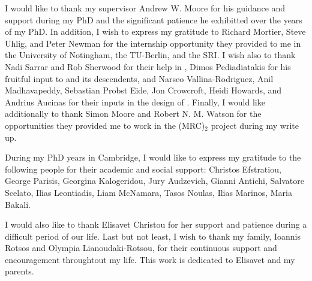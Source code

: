 

\begin{acknowledgements}      %


I would like to thank my supervisor Andrew W. Moore for his guidance and
support during my PhD and the significant patience he exhibitted over the years
of my PhD. In addition, I wish to express my gratitude to Richard Mortier,
Steve Uhlig, and Peter Newman for the internship opportunity they provided to
me in the University of Notingham, the TU-Berlin, and the SRI\@. I wish also to
thank Nadi Sarrar and Rob Sherwood for their help in \oflops, Dimos
Pediadiatakis for his fruitful input to \sdnsim and its descendents, and Narseo
Vallina-Rodriguez, Anil Madhavapeddy, Sebastian Probst Eide, Jon Crowcroft,
Heidi Howards, and Andrius Aucinas for their inputs in the design of \signpost.
Finally, I would like additionally to thank Simon Moore and Robert N. M. Watson
for the opportunities they provided me to work in the (MRC)$_2$ project during
my write up.

During my PhD years in Cambridge, I would like to express my gratitude to the
following people for their academic and social support: Christos Efstratiou,
George Parisis, Georgina Kalogeridou, Jury Audzevich, Gianni Antichi, Salvatore
Scelato, Ilias Leontiadis, Liam McNamara, Tasos Noulas, Ilias Marinos, Maria
Bakali.

I would also like to thank Elisavet Christou for her support and patience
during a difficult period of our life. Last but not least, I wish to thank my
family, Ioannis Rotsos and Olympia Lianoudaki-Rotsou, for their continuous
support and encouragement throughtout my life. This work is dedicated to
Elisavet and my parents. 

\end{acknowledgements}


